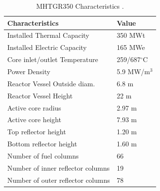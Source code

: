 \documentclass[11pt,letterpaper]{article}
\begin{document}
\begin{table}[htbp!]
  \centering
    \caption{MHTGR350 Characteristics \cite{oecd_nea_benchmark_2017}.}
  \begin{tabular}{ll}
  \toprule
  Characteristics                   & Value               \\ \midrule
  Installed Thermal Capacity        & 350 MWt             \\
  Installed Electric Capacity       & 165 MWe             \\
  Core inlet/outlet Temperature     & 259/687$^{\circ}$C  \\
  Power Density                     & 5.9 MW/m$^3$        \\
  Reactor Vessel Outside diam.      & 6.8 m               \\
  Reactor Vessel Height             & 22 m                \\
  Active core radius                & 2.97 m              \\
  Active core height                & 7.93 m              \\
  Top reflector height              & 1.20 m              \\
  Bottom reflector height           & 1.60 m              \\
  Number of fuel columns            & 66                  \\
  Number of inner reflector columns & 19                  \\
  Number of outer reflector columns & 78                  \\
  \bottomrule
  \end{tabular}
  \label{tab:maincharac}
\end{table}
\end{document}
